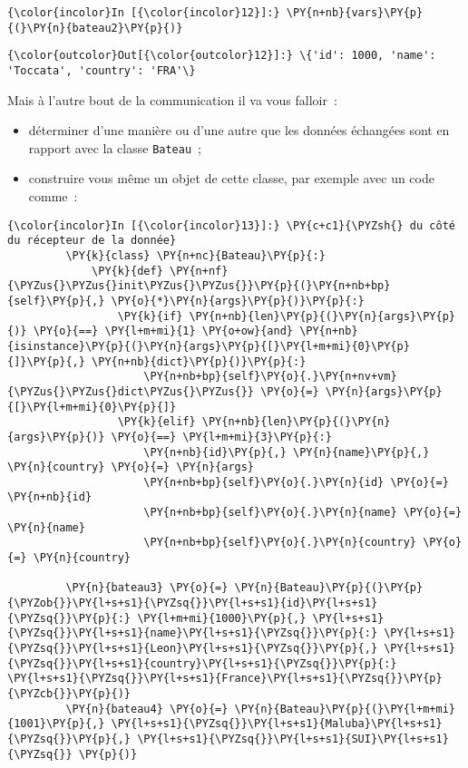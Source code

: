     \begin{Verbatim}[commandchars=\\\{\}]
{\color{incolor}In [{\color{incolor}12}]:} \PY{n+nb}{vars}\PY{p}{(}\PY{n}{bateau2}\PY{p}{)}
\end{Verbatim}


\begin{Verbatim}[commandchars=\\\{\}]
{\color{outcolor}Out[{\color{outcolor}12}]:} \{'id': 1000, 'name': 'Toccata', 'country': 'FRA'\}
\end{Verbatim}
            
    Mais à l'autre bout de la communication il va vous falloir~:

\begin{itemize}
\tightlist
\item
  déterminer d'une manière ou d'une autre que les données échangées sont
  en rapport avec la classe \texttt{Bateau}~;
\item
  construire vous même un objet de cette classe, par exemple avec un
  code comme~:
\end{itemize}

    \begin{Verbatim}[commandchars=\\\{\}]
{\color{incolor}In [{\color{incolor}13}]:} \PY{c+c1}{\PYZsh{} du côté du récepteur de la donnée}
         \PY{k}{class} \PY{n+nc}{Bateau}\PY{p}{:}
             \PY{k}{def} \PY{n+nf}{\PYZus{}\PYZus{}init\PYZus{}\PYZus{}}\PY{p}{(}\PY{n+nb+bp}{self}\PY{p}{,} \PY{o}{*}\PY{n}{args}\PY{p}{)}\PY{p}{:}
                 \PY{k}{if} \PY{n+nb}{len}\PY{p}{(}\PY{n}{args}\PY{p}{)} \PY{o}{==} \PY{l+m+mi}{1} \PY{o+ow}{and} \PY{n+nb}{isinstance}\PY{p}{(}\PY{n}{args}\PY{p}{[}\PY{l+m+mi}{0}\PY{p}{]}\PY{p}{,} \PY{n+nb}{dict}\PY{p}{)}\PY{p}{:}
                     \PY{n+nb+bp}{self}\PY{o}{.}\PY{n+nv+vm}{\PYZus{}\PYZus{}dict\PYZus{}\PYZus{}} \PY{o}{=} \PY{n}{args}\PY{p}{[}\PY{l+m+mi}{0}\PY{p}{]}
                 \PY{k}{elif} \PY{n+nb}{len}\PY{p}{(}\PY{n}{args}\PY{p}{)} \PY{o}{==} \PY{l+m+mi}{3}\PY{p}{:}
                     \PY{n+nb}{id}\PY{p}{,} \PY{n}{name}\PY{p}{,} \PY{n}{country} \PY{o}{=} \PY{n}{args}
                     \PY{n+nb+bp}{self}\PY{o}{.}\PY{n}{id} \PY{o}{=} \PY{n+nb}{id}
                     \PY{n+nb+bp}{self}\PY{o}{.}\PY{n}{name} \PY{o}{=} \PY{n}{name}
                     \PY{n+nb+bp}{self}\PY{o}{.}\PY{n}{country} \PY{o}{=} \PY{n}{country}
         
         \PY{n}{bateau3} \PY{o}{=} \PY{n}{Bateau}\PY{p}{(}\PY{p}{\PYZob{}}\PY{l+s+s1}{\PYZsq{}}\PY{l+s+s1}{id}\PY{l+s+s1}{\PYZsq{}}\PY{p}{:} \PY{l+m+mi}{1000}\PY{p}{,} \PY{l+s+s1}{\PYZsq{}}\PY{l+s+s1}{name}\PY{l+s+s1}{\PYZsq{}}\PY{p}{:} \PY{l+s+s1}{\PYZsq{}}\PY{l+s+s1}{Leon}\PY{l+s+s1}{\PYZsq{}}\PY{p}{,} \PY{l+s+s1}{\PYZsq{}}\PY{l+s+s1}{country}\PY{l+s+s1}{\PYZsq{}}\PY{p}{:} \PY{l+s+s1}{\PYZsq{}}\PY{l+s+s1}{France}\PY{l+s+s1}{\PYZsq{}}\PY{p}{\PYZcb{}}\PY{p}{)}
         \PY{n}{bateau4} \PY{o}{=} \PY{n}{Bateau}\PY{p}{(}\PY{l+m+mi}{1001}\PY{p}{,} \PY{l+s+s1}{\PYZsq{}}\PY{l+s+s1}{Maluba}\PY{l+s+s1}{\PYZsq{}}\PY{p}{,} \PY{l+s+s1}{\PYZsq{}}\PY{l+s+s1}{SUI}\PY{l+s+s1}{\PYZsq{}} \PY{p}{)}
\end{Verbatim}



